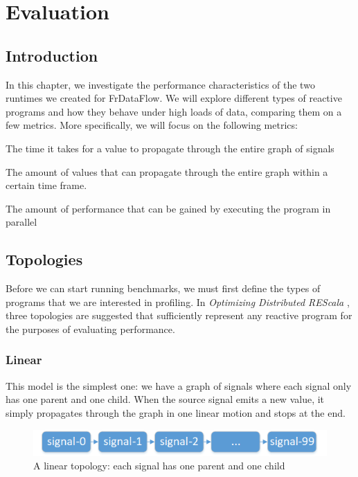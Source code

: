 \chapter{Evaluation}

\section{Introduction}

In this chapter, we investigate the performance characteristics of the two runtimes we created for FrDataFlow. We will explore different types of reactive programs and how they behave under high loads of data, comparing them on a few metrics. More specifically, we will focus on the following metrics:

\begin{description}[style=nextline]
  \item [Latency]		The time it takes for a value to propagate through the entire graph of signals
  \item [Throughput]	The amount of values that can propagate through the entire graph within a certain time frame.
  \item [Scaling]		The amount of performance that can be gained by executing the program in parallel
\end{description}

\section{Topologies}

Before we can start running benchmarks, we must first define the types of programs that we are interested in profiling. In \textit{Optimizing Distributed REScala} \cite{drechsler_optimizing_2014}, three topologies are suggested that sufficiently represent any reactive program for the purposes of evaluating performance.

\subsection{Linear}

This model is the simplest one: we have a graph of signals where each signal only has one parent and one child. When the source signal emits a new value, it simply propagates through the graph in one linear motion and stops at the end. 

\begin{figure}[h]
	\centerline{\includegraphics[scale=0.7]{images/Evaluation-Topologies-Linear.png}}
	\caption{A linear topology: each signal has one parent and one child}
	\label{fig:evaluation-topologies-linear}
\end{figure}

